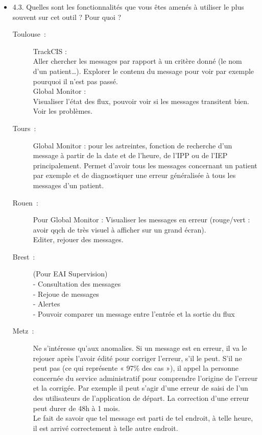 \begin{itemize}
	  \item 4.3. Quelles sont les fonctionnalités que vous êtes amenés à utiliser le
	  plus souvent sur cet outil ? Pour quoi ?
	  \begin{description}
	  	\item[Toulouse~:] TrackCIS :\\
		Aller chercher les messages par rapport à un critère donné (le nom d’un patient…).
		Explorer le contenu du message pour voir par exemple pourquoi il n’est pas
		passé.\\
		Global Monitor :\\
		Visualiser l’état des flux, pouvoir voir si les messages transitent bien.
		Voir les problèmes.
	  	\item[Tours~:] Global Monitor : pour les astreintes, fonction de recherche
	  	d’un message à partir de la date et de l’heure, de l’IPP ou de l’IEP principalement.
	  	Permet d’avoir tous les messages concernant un patient par exemple et de
	  	diagnostiquer une erreur généralisée à tous les messages d’un patient.
	  	\item[Rouen~:] Pour Global Monitor :
		Visualiser les messages en erreur (rouge/vert : avoir qqch de très visuel à
		afficher sur un grand écran).\\
		Editer, rejouer des messages.
	  	\item[Brest~:] (Pour EAI Supervision)\\
	  	- Consultation des messages\\
		- Rejoue de messages\\
		- Alertes\\
		- Pouvoir comparer un message entre l’entrée et la sortie du flux
	  	\item[Metz~:] Ne s’intéresse qu’aux anomalies. Si un message est en erreur,
	  	il va le rejouer après l’avoir édité pour corriger l’erreur, s’il le peut.
	  	S’il ne peut pas (ce qui représente « 97\% des cas »), il appel la personne
	  	concernée du service administratif pour comprendre l’origine de l’erreur
	  	et la corrigée. Par exemple il peut s’agir d’une erreur de saisi de l’un
	  	des utilisateurs de l’application de départ. La correction d’une erreur
	  	peut durer de 48h à 1 mois.\\
		Le fait de savoir que tel message est parti de tel endroit, à telle heure, il
		est arrivé correctement à telle autre endroit.
	  \end{description}
	  

\end{itemize}
